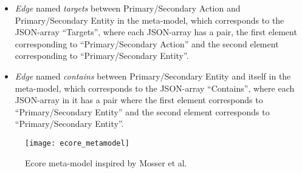 \begin{itemize}
	\item \textit{Edge} named \textit{targets} between Primary/Secondary Action and Primary/Secondary Entity in the meta-model, which corresponds to the JSON-array \enquote{Targets}, where each JSON-array has a pair, the first element corresponding to \enquote{Primary/Secondary Action} and the second element corresponding to \enquote{Primary/Secondary Entity}.
	\item \textit{Edge} named \textit{contains} between Primary/Secondary Entity and itself in the meta-model, which corresponds to the JSON-array \enquote{Contains}, where each JSON-array in it has a pair where the first element corresponds to \enquote{Primary/Secondary Entity} and the second element corresponds to \enquote{Primary/Secondary Entity}.
\end{itemize}

\begin{figure}[h]
	\center
	\texttt{[image: ecore\_metamodel]}
	\caption{Ecore meta-model inspired by Mosser et al. \cite{mosser2022modelling}}\label{fig:ecore_meta_model}
\end{figure} 
